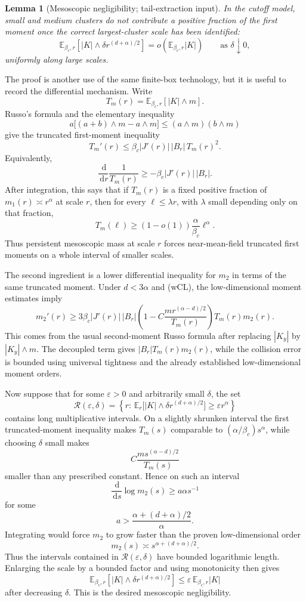 \documentclass[11pt,reqno]{book}
\numberwithin{equation}{chapter}
\theoremstyle{plain}
\newtheorem{lemma}[theorem]{Lemma}
\theoremstyle{definition}
\theoremstyle{remark}
\newcommand{\E}{\mathbb E}
\newcommand{\eps}{\varepsilon}
\newcommand{\1}{\mathbf 1}
\newcommand{\dd}{\,\mathrm d}
\begin{document}
\begin{lemma}[Mesoscopic negligibility; tail-extraction input]
In the cutoff model, small and medium clusters do not contribute a positive
fraction of the first moment once the correct largest-cluster scale has been
identified:
\[
  \E_{\beta_c,r}\!\left[
    |K|\wedge \delta r^{(d+\alpha)/2}
  \right]
  =
  o\!\left(\E_{\beta_c,r}|K|\right)
  \qquad\text{as }\delta\downarrow0,
\]
uniformly along large scales.
\end{lemma}

The proof is another use of the same finite-box technology, but it is useful
to record the differential mechanism. Write
\[
  T_m(r)=\E_{\beta_c,r}[|K|\wedge m].
\]
Russo's formula and the elementary inequality
\[
  a\bigl[(a+b)\wedge m-a\wedge m\bigr]
  \leq
  (a\wedge m)(b\wedge m)
\]
give the truncated first-moment inequality
\[
  T_m'(r)
  \leq
  \beta_c |J'(r)|\,|B_r|\,T_m(r)^2.
\]
Equivalently,
\[
  \frac{\dd}{\dd r}\frac1{T_m(r)}
  \geq
  -\beta_c |J'(r)|\,|B_r|.
\]
After integration, this says that if \(T_m(r)\) is a fixed positive fraction
of \(m_1(r)\asymp r^\alpha\) at scale \(r\), then for every
\(\ell\leq \lambda r\), with \(\lambda\) small depending only on that
fraction,
\[
  T_m(\ell)\geq (1-o(1))\frac{\alpha}{\beta_c}\ell^\alpha.
\]
Thus persistent mesoscopic mass at scale \(r\) forces near-mean-field
truncated first moments on a whole interval of smaller scales.

The second ingredient is a lower differential inequality for \(m_2\) in
terms of the same truncated moment. Under \(d<3\alpha\) and (wCL), the
low-dimensional moment estimates imply
\[
  m_2'(r)
  \geq
  3\beta_c |J'(r)|\,|B_r|
  \left(
    1-
    C\frac{m r^{(\alpha-d)/2}}{T_m(r)}
  \right)
  T_m(r)m_2(r).
\]
This comes from the usual second-moment Russo formula after replacing
\(|K_y|\) by \(|K_y|\wedge m\). The decoupled term gives
\(|B_r|T_m(r)m_2(r)\), while the collision error is bounded using
universal tightness and the already established low-dimensional moment
orders.

Now suppose that for some \(\eps>0\) and arbitrarily small \(\delta\), the
set
\[
  \mathscr R(\eps,\delta)
  =
  \left\{
    r:\,
    \E_r\bigl[|K|\wedge \delta r^{(d+\alpha)/2}\bigr]
    \geq \eps r^\alpha
  \right\}
\]
contains long multiplicative intervals. On a slightly shrunken interval the
first truncated-moment inequality makes \(T_m(s)\) comparable to
\((\alpha/\beta_c)s^\alpha\), while choosing \(\delta\) small makes
\[
  C\frac{m s^{(\alpha-d)/2}}{T_m(s)}
\]
smaller than any prescribed constant. Hence on such an interval
\[
  \frac{\dd}{\dd s}\log m_2(s)
  \geq
  a\alpha s^{-1}
\]
for some
\[
  a>\frac{\alpha+(d+\alpha)/2}{\alpha}.
\]
Integrating would force \(m_2\) to grow faster than the proven
low-dimensional order
\[
  m_2(s)\asymp s^{\alpha+(d+\alpha)/2}.
\]
Thus the intervals contained in \(\mathscr R(\eps,\delta)\) have bounded
logarithmic length. Enlarging the scale by a bounded factor and using
monotonicity then gives
\[
  \E_{\beta_c,r}\!\left[
    |K|\wedge \delta r^{(d+\alpha)/2}
  \right]
  \leq
  \eps\,\E_{\beta_c,r}|K|
\]
after decreasing \(\delta\). This is the desired mesoscopic negligibility.
\end{document}
